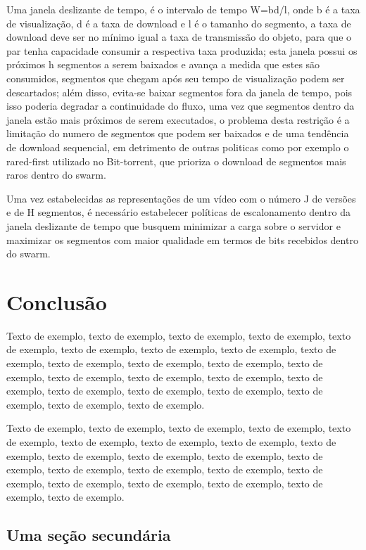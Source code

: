 \documentclass[
	12pt,				%
	oneside,			%
	a4paper,			%
	english,			%
	brazil				%
	]{abntex2ppgsi}
\begin{document}
Uma janela deslizante de tempo, é o intervalo de tempo W=bd/l, onde b é a taxa de visualização, d é a taxa de download e l é o tamanho do segmento, a taxa de download deve ser no mínimo igual a taxa de transmissão do objeto, para que o par tenha capacidade consumir a respectiva taxa produzida; esta janela possui os próximos h segmentos a serem baixados e avança a medida que estes são consumidos, segmentos que chegam após seu tempo de visualização podem ser descartados; além disso, evita-se baixar segmentos fora da janela de tempo, pois isso poderia degradar a continuidade do fluxo, uma vez que segmentos dentro da janela estão mais próximos de serem executados,  o problema desta restrição é a limitação do numero de segmentos que podem ser baixados e de uma tendência de download sequencial, em detrimento de outras politicas como por exemplo o rared-first utilizado no Bit-torrent, que prioriza o download de segmentos mais raros dentro do swarm.

Uma vez estabelecidas as representações de um vídeo com o número J de versões e de H segmentos, é necessário estabelecer políticas de escalonamento dentro da janela deslizante de tempo que busquem minimizar a carga sobre o servidor e maximizar os segmentos com maior qualidade em termos de bits recebidos dentro do swarm.

\chapter{Conclusão}

Texto de exemplo, texto de exemplo, texto de exemplo, texto de exemplo, texto de exemplo, texto de exemplo, texto de exemplo, texto de exemplo, texto de exemplo, texto de exemplo, texto de exemplo, texto de exemplo, texto de exemplo, texto de exemplo, texto de exemplo, texto de exemplo, texto de exemplo, texto de exemplo, texto de exemplo, texto de exemplo, texto de exemplo, texto de exemplo, texto de exemplo.

Texto de exemplo, texto de exemplo, texto de exemplo, texto de exemplo, texto de exemplo, texto de exemplo, texto de exemplo, texto de exemplo, texto de exemplo, texto de exemplo, texto de exemplo, texto de exemplo, texto de exemplo, texto de exemplo, texto de exemplo, texto de exemplo, texto de exemplo, texto de exemplo, texto de exemplo, texto de exemplo, texto de exemplo, texto de exemplo.

\section{Uma seção secundária}
\end{document}
